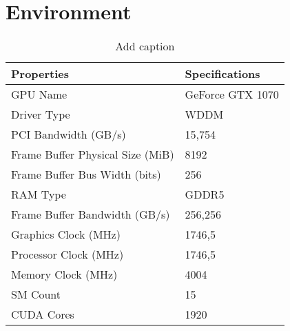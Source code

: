\documentclass[11pt]{article} %
\begin{document}
\section{Environment}
	\begin{table}[htbp]
		\centering
		\caption{Add caption}		
		\label{tab:addlabel}%
		\begin{tabular}{ll}
			Properties & Specifications \\\hline \hline 
			GPU Name & GeForce GTX 1070 \\ \hline 
			Driver Type & WDDM \\ \hline 
			PCI Bandwidth (GB/s) & 15,754 \\ \hline 
			Frame Buffer Physical Size (MiB) & 8192 \\ \hline 
			Frame Buffer Bus Width (bits) & 256 \\ \hline 
			RAM Type & GDDR5 \\ \hline 
			Frame Buffer Bandwidth (GB/s) & 256,256 \\ \hline 
			Graphics Clock (MHz) & 1746,5 \\ \hline 
			Processor Clock (MHz) & 1746,5 \\ \hline 
			Memory Clock (MHz) & 4004 \\ \hline 
			SM Count & 15 \\ \hline 
			CUDA Cores & 1920 \\ \hline 
		\end{tabular}%

	\end{table}%
		
%
%
\end{document}
